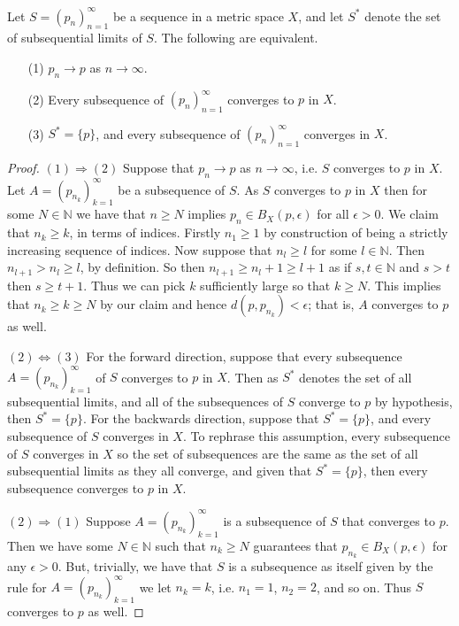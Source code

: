 \documentclass[10pt,reqno]{amsart}
\theoremstyle{definition}
\newcommand{\nn}{\mathbb N}
\begin{document}
\begin{tcolorbox}[colback=black!5!white,colframe=black!75!black,title= Chapter 4: Exercise $2.2.$] Let $S= (p_n)_{n=1}^\infty$ be a sequence in a metric space $X$, and let $S^\ast$ denote the set of subsequential limits of $S$. The following are equivalent.
\begin{itemize}
	\item [(1)] $p_n \to p$ as $n\to \infty$.
	\item [(2)] Every subsequence of $(p_n)_{n=1}^\infty$ converges to $p$ in $X$.
	\item [(3)] $S^\ast = \{ p \}$, and every subsequence of $(p_n)_{n=1}^\infty$ converges in $X$.
\end{itemize} 
\tcblower 
\begin{proof} $(1) \Rightarrow (2)$ Suppose that $p_n \to p$ as $n \to \infty$, i.e. $S$ converges to $p$ in $X$. Let $A = (p_{n_k})_{k=1}^\infty$ be a subsequence of $S$. As $S$ converges to $p$ in $X$ then for some $N \in \nn$ we have that $n\geq N$ implies $ p_n \in B_X(p,\epsilon)$ for all $\epsilon > 0$. We claim that $n_k \geq k$, in terms of indices. Firstly $n _1 \geq 1$ by construction of being a strictly increasing sequence of indices. Now suppose that $n_l \geq l$ for some $l \in \nn$. Then $n_{l+1} > n_l \geq l$, by definition. So then $n_{l+1} \geq n_l + 1 \geq l+1$ as if $s,t \in \nn$ and $s>t$ then $s \geq t+1$. Thus we can pick $k$ sufficiently large so that $k \geq N$. This implies that $n_k \geq k \geq N$ by our claim and hence $d(p, p_{n_k} ) < \epsilon$; that is, $A$ converges to $p$ as well. 

$(2) \Leftrightarrow (3)$  For the forward direction, suppose that every subsequence $A = (p_{n_k})_{k=1}^\infty$ of $S$ converges to $p$ in $X$. Then as $S^\ast$ denotes the set of all subsequential limits, and all of the subsequences of $S$ converge to $p$ by hypothesis, then $S^\ast = \{ p \}$.  For the backwards direction, suppose that $S^\ast = \{p \}$, and every subsequence of $S$ converges in $X$. To rephrase this assumption, every subsequence of $S$ converges in $X$ so the set of subsequences are the same as the set of all subsequential limits as they all converge, and given that $S^\ast = \{p \}$, then every subsequence converges to $p$ in $X$.

$(2) \Rightarrow (1)$ Suppose $A = (p_{n_k})_{k=1}^\infty$ is a subsequence of $S$ that converges to $p$. Then we have some $N \in \nn$ such that $n_k \geq N$ guarantees that $p_{n_k} \in B_X(p, \epsilon)$ for any $\epsilon > 0$. But, trivially, we have that $S$ is a subsequence as itself given by the rule for $A = (p_{n_k})_{k=1}^\infty$ we let $n_k = k$, i.e. $n_1 = 1$, $n_2 = 2$, and so on. Thus $S$ converges to $p$ as well.
\end{proof}

\end{tcolorbox}
\end{document}
